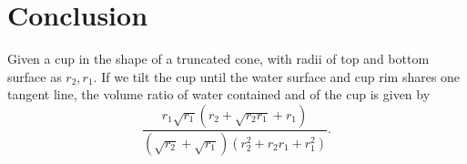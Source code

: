 \documentclass[a4paper]{article}
\begin{document}
\section{Conclusion}
Given a cup in the shape of a truncated cone, with radii of top and bottom surface as $r_2, r_1$. If we tilt the cup until the water surface and cup rim shares one tangent line, the volume ratio of water contained and of the cup is given by 
\[\frac{r_1\sqrt{r_1}(r_2+\sqrt{r_2r_1} + r_1)}{(\sqrt{r_2} + \sqrt{r_1})(r_2^2 + r_2r_1 + r_1^2)}.\]
\end{document}
